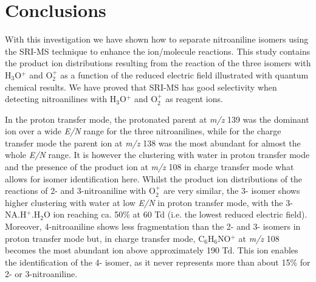 \section{Conclusions}
With this investigation we have shown how to separate nitroaniline isomers using the SRI-MS technique to enhance the ion/molecule reactions. This study contains the product ion distributions resulting from the reaction of the three isomers with H$_3$O$^+$ and O$_2^+$ as a function of the reduced electric field illustrated with quantum chemical results. 
We have proved that SRI-MS has good selectivity when detecting nitroanilines with H$_3$O$^+$ and O$_2^+$ as reagent ions. 

In the proton transfer mode, the protonated parent at \textit{m/z} 139 was the dominant ion over a wide \textit{E/N} range for the three nitroanilines, while for the charge transfer mode the parent ion at \textit{m/z} 138 was the most abundant for almost the whole \textit{E/N} range.
It is however the clustering with water in proton transfer mode and the presence of the product ion at \textit{m/z} 108 in charge transfer mode what allows for isomer identification here. 
Whilst the product ion distributions of the reactions of 2- and 3-nitroaniline with O$_2^+$ are very similar, the 3- isomer shows higher clustering with water at low \textit{E/N} in proton transfer mode, with the 3-NA.H$^+$.H$_2$O ion reaching ca. 50\% at 60 Td (i.e. the lowest reduced electric field). 
Moreover, 4-nitroaniline shows less fragmentation than the 2- and 3- isomers in proton transfer mode but, in charge transfer mode, C$_6$H$_6$NO$^+$ at \textit{m/z} 108 becomes the most abundant ion above approximately 190 Td. 
This ion enables the identification of the 4- isomer, as it never represents more than about 15\% for 2- or 3-nitroaniline.

